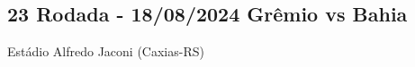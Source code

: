 \newpage
\subsection{23 Rodada - 18/08/2024 Grêmio vs Bahia}

\begin{figure}[H]
    \centering
    
\end{figure}

Estádio Alfredo Jaconi (Caxias-RS)